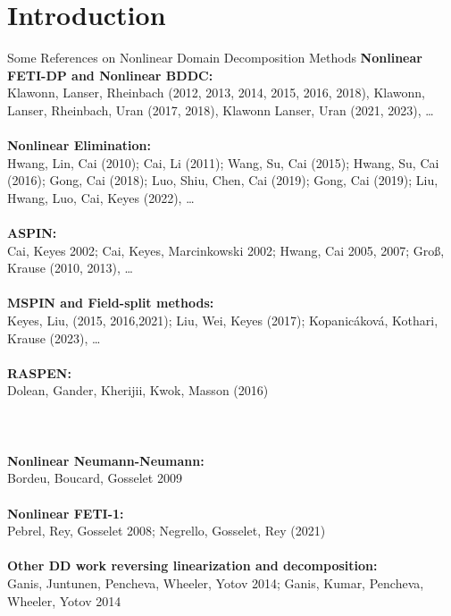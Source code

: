 \section{Introduction}

\begin{frame}{Some References on Nonlinear Domain Decomposition Methods}
	\tiny
	\textbf{Nonlinear FETI-DP and Nonlinear BDDC:}\\
	Klawonn, Lanser, Rheinbach (2012, 2013, 2014, 2015, 2016, 2018), Klawonn, Lanser, Rheinbach, Uran (2017, 2018), Klawonn Lanser, Uran (2021, 2023), \dots\\~\\

	\textbf{Nonlinear Elimination:}\\
	Hwang, Lin, Cai (2010); Cai, Li (2011); Wang, Su, Cai (2015); Hwang, Su, Cai (2016); Gong, Cai (2018); Luo, Shiu, Chen, Cai (2019); Gong, Cai (2019); Liu, Hwang, Luo, Cai, Keyes (2022), \dots\\~\\

	\textbf{ASPIN:}\\
	Cai, Keyes 2002; Cai, Keyes, Marcinkowski 2002; Hwang, Cai 2005, 2007; Groß, Krause (2010, 2013), \dots\\~\\

	\textbf{MSPIN and Field-split methods:}\\
	Keyes, Liu, (2015, 2016,2021); Liu, Wei, Keyes (2017); Kopanicáková, Kothari, Krause (2023), \dots\\~\\

	\textbf{RASPEN:}\\
	Dolean, Gander, Kherijii, Kwok, Masson (2016)\\~\\

	\hspace*{-2.7mm}
	\noindent{}\\~\\

	\textbf{Nonlinear Neumann-Neumann:}\\ Bordeu, Boucard, Gosselet 2009\\~\\

	\textbf{Nonlinear FETI-1:}\\
	Pebrel, Rey, Gosselet 2008; Negrello, Gosselet, Rey (2021)\\~\\

	\textbf{Other DD work reversing linearization and decomposition:}\\
	Ganis, Juntunen, Pencheva, Wheeler, Yotov 2014; Ganis, Kumar, Pencheva, Wheeler, Yotov 2014
\end{frame}


